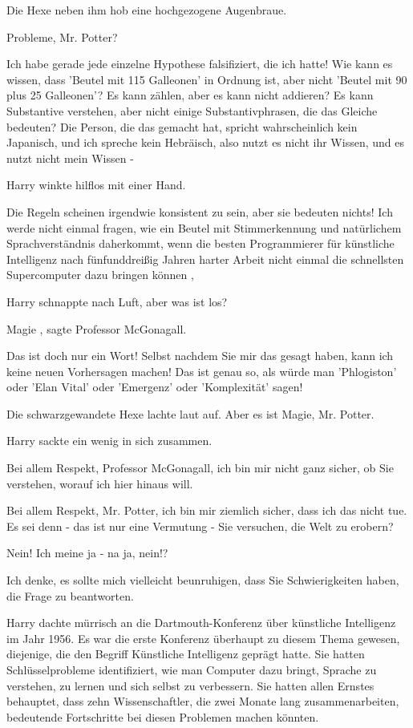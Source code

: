 Die Hexe neben ihm hob eine hochgezogene Augenbraue.

\glqq Probleme, Mr. Potter?\grqq{}

\glqq Ich habe gerade jede einzelne Hypothese falsifiziert, die ich hatte! Wie
kann es wissen, dass 'Beutel mit 115 Galleonen' in Ordnung ist, aber nicht
'Beutel mit 90 plus 25 Galleonen'? Es kann zählen, aber es kann nicht
addieren? Es kann Substantive verstehen, aber nicht einige
Substantivphrasen, die das Gleiche bedeuten? Die Person, die das gemacht
hat, spricht wahrscheinlich kein Japanisch, und ich spreche kein Hebräisch,
also nutzt es nicht ihr Wissen, und es nutzt nicht mein Wissen -\grqq{}

Harry winkte hilflos mit einer Hand.

\glqq Die Regeln scheinen irgendwie konsistent zu sein, aber sie bedeuten
nichts! Ich werde nicht einmal fragen, wie ein Beutel mit Stimmerkennung und
natürlichem Sprachverständnis daherkommt, wenn die besten Programmierer für
künstliche Intelligenz nach fünfunddreißig Jahren harter Arbeit nicht einmal
die schnellsten Supercomputer dazu bringen können\grqq{} ,

Harry schnappte nach Luft, \glqq aber was ist los?\grqq{}

\glqq Magie\grqq{} , sagte Professor McGonagall.

\glqq Das ist doch nur ein Wort! Selbst nachdem Sie mir das gesagt haben, kann
ich keine neuen Vorhersagen machen! Das ist genau so, als würde man
'Phlogiston' oder 'Elan Vital' oder 'Emergenz' oder 'Komplexität'
sagen!\grqq{}

Die schwarzgewandete Hexe lachte laut auf. \glqq Aber es ist Magie, Mr.
Potter.\grqq{}

Harry sackte ein wenig in sich zusammen.

\glqq Bei allem Respekt, Professor McGonagall, ich bin mir nicht ganz sicher, ob
Sie verstehen, worauf ich hier hinaus will.\grqq{}

\glqq Bei allem Respekt, Mr. Potter, ich bin mir ziemlich sicher, dass ich das
nicht tue. Es sei denn - das ist nur eine Vermutung - Sie versuchen, die
Welt zu erobern?\grqq{}

\glqq Nein! Ich meine ja - na ja, nein!?\grqq{}

\glqq Ich denke, es sollte mich vielleicht beunruhigen, dass Sie Schwierigkeiten
haben, die Frage zu beantworten.\grqq{}

Harry dachte mürrisch an die Dartmouth-Konferenz über künstliche Intelligenz im
Jahr 1956. Es war die erste Konferenz überhaupt zu diesem Thema gewesen,
diejenige, die den Begriff \glqq Künstliche Intelligenz\grqq{} geprägt
hatte. Sie hatten Schlüsselprobleme identifiziert, wie man Computer dazu
bringt, Sprache zu verstehen, zu lernen und sich selbst zu verbessern. Sie
hatten allen Ernstes behauptet, dass zehn Wissenschaftler, die zwei Monate
lang zusammenarbeiten, bedeutende Fortschritte bei diesen Problemen machen
könnten.

